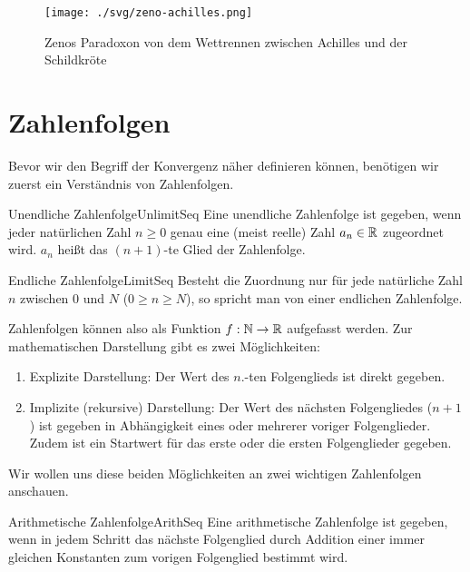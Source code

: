 \begin{figure}
	\centering
	\texttt{[image: ./svg/zeno-achilles.png]}
	\caption[Zenos Paradoxon des Wettrennens]{Zenos Paradoxon von dem Wettrennen zwischen Achilles und der Schildkröte}
	\label{fig:ZenoAchilles}
\end{figure}

\section{Zahlenfolgen}

Bevor wir den Begriff der Konvergenz näher definieren können, benötigen wir zuerst ein Verständnis von Zahlenfolgen.

\begin{definition}{Unendliche Zahlenfolge}{UnlimitSeq}
	Eine unendliche Zahlenfolge ist gegeben, wenn jeder natürlichen Zahl $n \ge 0$  genau eine (meist reelle) Zahl $a_n\in\mathbb{R}$ zugeordnet wird. $a_n$ heißt das $(n+1)$-te Glied der Zahlenfolge.
\end{definition}

\begin{definition}{Endliche Zahlenfolge}{LimitSeq}
	Besteht die Zuordnung nur für jede natürliche Zahl $n$ zwischen 0 und $N$ ($0 \ge n \ge N$), so spricht man von einer endlichen Zahlenfolge.
\end{definition}

Zahlenfolgen können also als Funktion $f: \mathbb{N} \to \mathbb{R}$ aufgefasst werden. Zur mathematischen Darstellung gibt es zwei Möglichkeiten:

\begin{enumerate}
	\item Explizite Darstellung: Der Wert des $n$.-ten Folgenglieds ist direkt gegeben.
	\item Implizite (rekursive) Darstellung: Der Wert des nächsten Folgengliedes ($n+1$) ist gegeben in Abhängigkeit eines oder mehrerer voriger Folgenglieder. Zudem ist ein Startwert für das erste oder die ersten Folgenglieder gegeben.
\end{enumerate}

Wir wollen uns diese beiden Möglichkeiten an zwei wichtigen Zahlenfolgen anschauen.

\begin{definition}{Arithmetische Zahlenfolge}{ArithSeq}
	Eine arithmetische Zahlenfolge ist gegeben, wenn in jedem Schritt das nächste Folgenglied durch Addition einer immer gleichen Konstanten zum vorigen Folgenglied bestimmt wird.
\end{definition}

